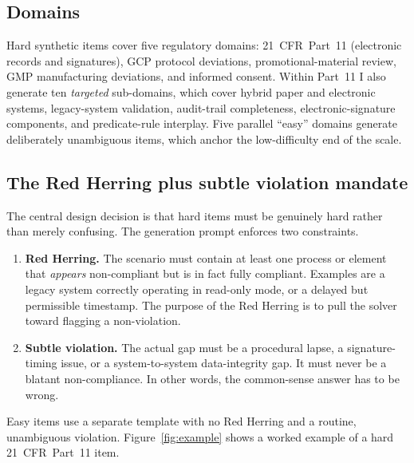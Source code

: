 \subsection{Domains}
\label{sec:domains}
Hard synthetic items cover five regulatory domains: 21~CFR~Part~11
\citep{fda21cfr11} (electronic records and signatures), GCP protocol
deviations, promotional-material review, GMP manufacturing deviations,
and informed consent. Within Part~11 I also generate ten \emph{targeted}
sub-domains, which cover hybrid paper and electronic systems,
legacy-system validation, audit-trail completeness, electronic-signature
components, and predicate-rule interplay. Five parallel ``easy'' domains
generate deliberately unambiguous items, which anchor the low-difficulty
end of the scale.

\subsection{The Red Herring plus subtle violation mandate}
The central design decision is that hard items must be genuinely hard
rather than merely confusing. The generation prompt enforces two
constraints.

\begin{enumerate}[leftmargin=1.4em,topsep=2pt]
  \item \textbf{Red Herring.} The scenario must contain at least one
  process or element that \emph{appears} non-compliant but is in fact
  fully compliant. Examples are a legacy system correctly operating in
  read-only mode, or a delayed but permissible timestamp. The purpose of
  the Red Herring is to pull the solver toward flagging a non-violation.
  \item \textbf{Subtle violation.} The actual gap must be a procedural
  lapse, a signature-timing issue, or a system-to-system data-integrity
  gap. It must never be a blatant non-compliance. In other words, the
  common-sense answer has to be wrong.
\end{enumerate}

Easy items use a separate template with no Red Herring and a routine,
unambiguous violation. Figure~\ref{fig:example} shows a worked example of
a hard 21~CFR~Part~11 item.

